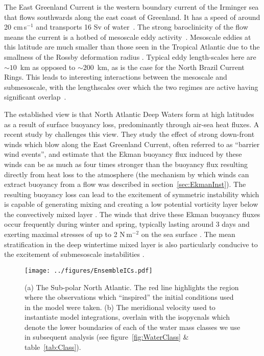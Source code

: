 The East Greenland Current is the western boundary current of the Irminger sea that flows southwards along the east coast of Greenland. It has a speed of around 20 cm\,s$^{-1}$ and transports 16 Sv of water~\citep{Talley2011ArcOce, Talley2011AtlOce}. The strong baroclinicity of the flow means the current is a hotbed of mesoscale eddy activity~\citep{Foldvik1988}. Mesoscale eddies at this latitude are much smaller than those seen in the Tropical Atlantic due to the smallness of the Rossby deformation radius \citep{Chelton1998}. Typical eddy length-scales here are $\sim 10$~km as opposed to $\sim 200$~km, as is the case for the North Brazil Current Rings. This leads to interesting interactions between the mesoscale and submesoscale, with the lengthscales over which the two regimes are active having significant overlap~\citep{Gula2022}.

The established view is that North Atlantic Deep Waters form at high latitudes as a result of surface buoyancy loss, predominantly through air-sea heat fluxes. A recent study by \citet{LeBras2022} challenges this view. They study the effect of strong down-front winds which blow along the East Greenland Current, often referred to as ``barrier wind events'', and estimate that the Ekman buoyancy flux induced by these winds can be as much as four times stronger than the buoyancy flux resulting directly from heat loss to the atmosphere (the mechanism by which winds can extract buoyancy from a flow was described in section~\ref{sec:EkmanInst}). The resulting buoyancy loss can lead to the excitement of symmetric instability which is capable of generating mixing and creating a low potential vorticity layer below the convectively mixed layer \citep{Taylor2010, Yu2021}. The winds that drive these Ekman buoyancy fluxes occur frequently during winter and spring, typically lasting around 3 days and exerting maximal stresses of up to 2 N\,m$^{-2}$ on the sea surface \citep{LeBras2022}. The mean stratification in the deep wintertime mixed layer is also particularly conducive to the excitement of submesoscale instabilities \citep{Brannigan2015}.

\begin{figure}[t]
    \centering
    \texttt{[image: ../figures/EnsembleICs.pdf]}
    \caption{(a) The Sub-polar North Atlantic. The red line highlights the region where the observations which ``inspired'' the initial conditions used in the model were taken. (b) The meridional velocity used to instantiate model integrations, overlain with the isopycnals which denote the lower boundaries of each of the water mass classes we use in subsequent analysis (see figure~\ref{fig:WaterClass} \& table~\ref{tab:Class}).}
    \label{fig:EnsembleICs}
\end{figure}

